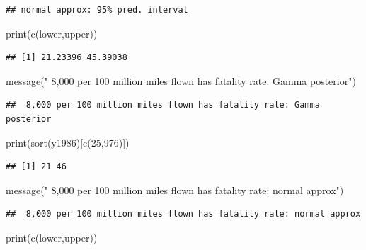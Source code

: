 \documentclass[
]{book}
\newenvironment{Shaded}{\begin{snugshade}}{\end{snugshade}}
\newcommand{\DecValTok}[1]{\textcolor[rgb]{0.00,0.00,0.81}{#1}}
\newcommand{\FunctionTok}[1]{\textcolor[rgb]{0.00,0.00,0.00}{#1}}
\newcommand{\NormalTok}[1]{#1}
\newcommand{\StringTok}[1]{\textcolor[rgb]{0.31,0.60,0.02}{#1}}
\theoremstyle{definition}
\theoremstyle{definition}
\theoremstyle{definition}
\theoremstyle{definition}
\theoremstyle{remark}
\begin{document}
\begin{verbatim}
## normal approx: 95% pred. interval
\end{verbatim}

\begin{Shaded}
\begin{Highlighting}[]
 \FunctionTok{print}\NormalTok{(}\FunctionTok{c}\NormalTok{(lower,upper))}
\end{Highlighting}
\end{Shaded}

\begin{verbatim}
## [1] 21.23396 45.39038
\end{verbatim}

\begin{Shaded}
\begin{Highlighting}[]
 \FunctionTok{message}\NormalTok{(}\StringTok{" 8,000 per 100 million miles flown has fatality rate: Gamma posterior"}\NormalTok{)}
\end{Highlighting}
\end{Shaded}

\begin{verbatim}
##  8,000 per 100 million miles flown has fatality rate: Gamma posterior
\end{verbatim}

\begin{Shaded}
\begin{Highlighting}[]
 \FunctionTok{print}\NormalTok{(}\FunctionTok{sort}\NormalTok{(y1986)[}\FunctionTok{c}\NormalTok{(}\DecValTok{25}\NormalTok{,}\DecValTok{976}\NormalTok{)])}
\end{Highlighting}
\end{Shaded}

\begin{verbatim}
## [1] 21 46
\end{verbatim}

\begin{Shaded}
\begin{Highlighting}[]
 \FunctionTok{message}\NormalTok{(}\StringTok{" 8,000 per 100 million miles flown has fatality rate: normal approx"}\NormalTok{)}
\end{Highlighting}
\end{Shaded}

\begin{verbatim}
##  8,000 per 100 million miles flown has fatality rate: normal approx
\end{verbatim}

\begin{Shaded}
\begin{Highlighting}[]
 \FunctionTok{print}\NormalTok{(}\FunctionTok{c}\NormalTok{(lower,upper))}
\end{Highlighting}
\end{Shaded}
\end{document}
